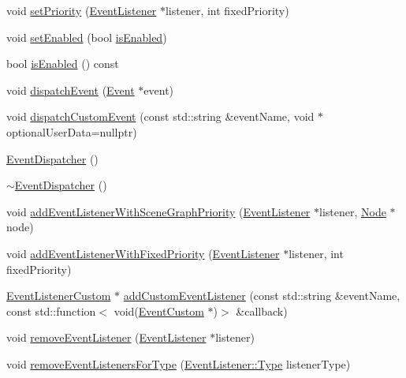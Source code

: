\begin{DoxyCompactItemize}
\item 
void \hyperlink{classEventDispatcher_a8368f3f3945977b5a5c3d0cc75f90cd5}{set\+Priority} (\hyperlink{classEventListener}{Event\+Listener} $\ast$listener, int fixed\+Priority)
\item 
void \hyperlink{classEventDispatcher_a1fc28fe8361af5b2a2fb9b108d89da42}{set\+Enabled} (bool \hyperlink{classEventDispatcher_a5350c4316fd57701602cb7d9f5fb8535}{is\+Enabled})
\item 
bool \hyperlink{classEventDispatcher_a5350c4316fd57701602cb7d9f5fb8535}{is\+Enabled} () const
\item 
void \hyperlink{classEventDispatcher_ac6358a032a83c7b1bc3df9beb8f753fe}{dispatch\+Event} (\hyperlink{classEvent}{Event} $\ast$event)
\item 
void \hyperlink{classEventDispatcher_aca6dac5b1a5363409c51331bc3142bea}{dispatch\+Custom\+Event} (const std\+::string \&event\+Name, void $\ast$optional\+User\+Data=nullptr)
\item 
\hyperlink{classEventDispatcher_aec174a9e25796e5727e59f5452817cda}{Event\+Dispatcher} ()
\item 
\hyperlink{classEventDispatcher_abb5f401014e87f03027d6c4450964e55}{$\sim$\+Event\+Dispatcher} ()
\item 
void \hyperlink{classEventDispatcher_a90b97ea5ad9bff4d684ca5bb6d5618bc}{add\+Event\+Listener\+With\+Scene\+Graph\+Priority} (\hyperlink{classEventListener}{Event\+Listener} $\ast$listener, \hyperlink{classNode}{Node} $\ast$node)
\item 
void \hyperlink{classEventDispatcher_a8a874f85b82c33d52a654289d6146bfb}{add\+Event\+Listener\+With\+Fixed\+Priority} (\hyperlink{classEventListener}{Event\+Listener} $\ast$listener, int fixed\+Priority)
\item 
\hyperlink{classEventListenerCustom}{Event\+Listener\+Custom} $\ast$ \hyperlink{classEventDispatcher_a7f5fe2c96f5072f1666db7be277aca73}{add\+Custom\+Event\+Listener} (const std\+::string \&event\+Name, const std\+::function$<$ void(\hyperlink{classEventCustom}{Event\+Custom} $\ast$)$>$ \&callback)
\item 
void \hyperlink{classEventDispatcher_a482553aa81d004ba84ad2f7fc1a99408}{remove\+Event\+Listener} (\hyperlink{classEventListener}{Event\+Listener} $\ast$listener)
\item 
void \hyperlink{classEventDispatcher_ad021a18c05461b34ab2a11ad2cdb268d}{remove\+Event\+Listeners\+For\+Type} (\hyperlink{classEventListener_ab78e6acdfa2343490eda9e92d1555ee4}{Event\+Listener\+::\+Type} listener\+Type)

\end{DoxyCompactItemize}
